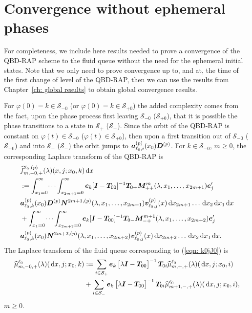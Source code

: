 \chapter{Convergence without ephemeral phases\label{app:extend conv}}
For completeness, we include here results needed to prove a convergence of the QBD-RAP scheme to the fluid queue without the need for the ephemeral initial states. Note that we only need to prove convergence up to, and at, the time of the first change of level of the QBD-RAP, then we can use the results from Chapter~\ref{ch: global results} to obtain global convergence results. 

For \(\varphi(0)=k\in\mathcal S_{-0}\) (or \(\varphi(0)=k\in\mathcal S_{+0}\)) the added complexity comes from the fact, upon the phase process first leaving \(\mathcal S_{-0}\) (\(\mathcal S_{+0}\)), that it is possible the phase transitions to a state in \(\mathcal S_+\) (\(\mathcal S_-\)). Since the orbit of the QBD-RAP is constant on \(\varphi(t)\in\mathcal S_{-0}\) (\(\varphi(t)\in\mathcal S_{+0}\)), then upon a first transition out of \(\mathcal S_{-0}\) (\(\mathcal S_{+0}\)) and into \(\mathcal S_+\) (\(\mathcal S_-\)) the orbit jumps to \(\boldsymbol   a_{\ell_0,i}^{(p)}(x_0)\boldsymbol D^{(p)}\). For \(k\in\mathcal S_{-0}\), \(m\geq 0\), the corresponding Laplace transform of the QBD-RAP is
\begin{align}
	&\widehat{f}_{m,-0,+}^{\ell_0,(p)}(\lambda)(x,j;x_0,k)\, \mathrm{d} x\nonumber 
	\\&:=\int_{x_1=0}^\infty \dots \int_{x_{2m+1}=0}^\infty  \boldsymbol e_k [\boldsymbol I - \boldsymbol T_{00}]^{-1}\boldsymbol T_{0+}\boldsymbol M^m_{++}(\lambda,x_1,\dots,x_{2m+1})\boldsymbol e_j'{} \nonumber
	\\& \boldsymbol a_{\ell_0,k}^{(p)}(x_0) \boldsymbol D^{(p)} \boldsymbol N^{2m+1,(p)}(\lambda,x_1,\dots,x_{2m+1}) {\boldsymbol v}_{\ell_0,j}^{(p)}(x)\, \mathrm{d} x_{2m+1}\dots\, \mathrm{d} x_2 \, \mathrm{d} x_1 \, \mathrm{d} x \nonumber
	\\& + \int_{x_1=0}^\infty \dots \int_{x_{2m+2}=0}^\infty  \boldsymbol e_k [\boldsymbol I - \boldsymbol T_{00}]^{-1}\boldsymbol T_{0-}\boldsymbol M^{m+1}_{-+}(\lambda,x_1,\dots,x_{2m+2})\boldsymbol e_j'{} \nonumber
	\\& \boldsymbol a_{\ell_0,k}^{(p)}(x_0)\boldsymbol N^{2m+2,(p)}(\lambda,x_1,\dots,x_{2m+2}) {\boldsymbol v}_{\ell_0,j}^{(p)}(x)\, \mathrm{d} x_{2m+2}\dots\, \mathrm{d} x_2 \, \mathrm{d} x_1 \, \mathrm{d} x.
	\label{eqn: k0jJ0}
\end{align}
The Laplace transform of the fluid queue corresponding to (\ref{eqn: k0jJ0}) is 
\begin{align}  
	\widehat \mu_{m,-0,+}^{\ell_0}(\lambda)(\, \mathrm{d} x,j;x_0,k) \nonumber 
	&:= \sum_{i\in\mathcal{S}_+}\boldsymbol e_k\begin{bmatrix} \lambda \boldsymbol I - \boldsymbol T_{00} \end{bmatrix}^{-1}\boldsymbol T_{0i}\widehat \mu_{m,+,+}^{\ell_0}(\lambda)(\, \mathrm{d} x,j;x_0,i) 
	\\&{}+ \sum_{i\in\mathcal{S}_-}\boldsymbol e_k\begin{bmatrix} \lambda \boldsymbol I - \boldsymbol T_{00} \end{bmatrix}^{-1}\boldsymbol T_{0i}\widehat \mu_{m+1,-,+}^{\ell_0}(\lambda)(\, \mathrm{d} x,j;x_0,i), \label{eqn: s0- actual}
\end{align}
\(m\geq 0\).

